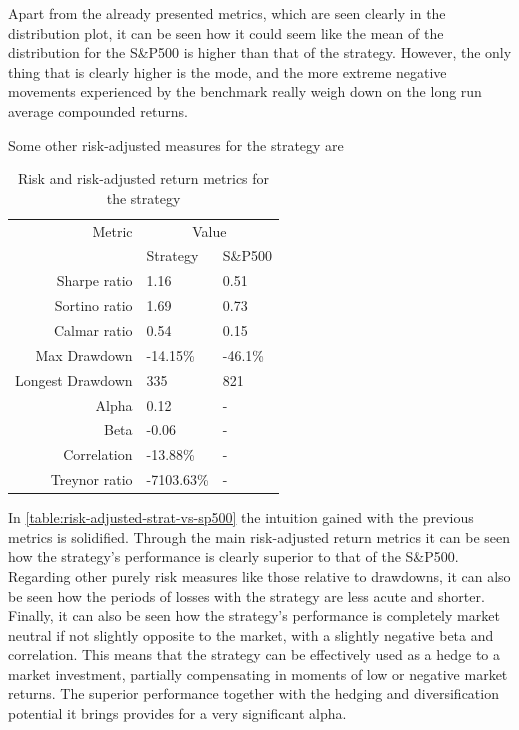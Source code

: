 Apart from the already presented metrics, which are seen clearly in the distribution plot, it can be seen how it could seem like the mean of the distribution for the S\&P500 is higher than that of the strategy. However, the only thing that is clearly higher is the mode, and the more extreme negative movements experienced by the benchmark really weigh down on the long run average compounded returns. 

Some other risk-adjusted measures for the strategy are 
\begin{table}[ht]
    \centering
    \begin{tabular}{rll}
        \toprule
        Metric & \multicolumn{2}{c}{Value} \\ 
        \cmidrule(lr){2-3}
            & Strategy & S\&P500 \\
        \midrule
        Sharpe ratio & 1.16 & 0.51 \\
        Sortino ratio & 1.69 & 0.73 \\
        Calmar ratio & 0.54 & 0.15 \\
        Max Drawdown & -14.15\% & -46.1\% \\
        Longest Drawdown & 335 & 821 \\
        Alpha & 0.12 & - \\
        Beta & -0.06 & - \\
        Correlation & -13.88\% & - \\
        Treynor ratio & -7103.63\% & - \\
        \bottomrule
    \end{tabular}
    \caption{Risk and risk-adjusted return metrics for the strategy}
    \label{table:risk-adjusted-strat-vs-sp500}
\end{table}

In \autoref{table:risk-adjusted-strat-vs-sp500} the intuition gained with the previous metrics is solidified. Through the main risk-adjusted return metrics it can be seen how the strategy's performance is clearly superior to that of the S\&P500. Regarding other purely risk measures like those relative to drawdowns, it can also be seen how the periods of losses with the strategy are less acute and shorter. Finally, it can also be seen how the strategy's performance is completely market neutral if not slightly opposite to the market, with a slightly negative beta and correlation. This means that the strategy can be effectively used as a hedge to a market investment, partially compensating in moments of low or negative market returns. The superior performance together with the hedging and diversification potential it brings provides for a very significant alpha. 


